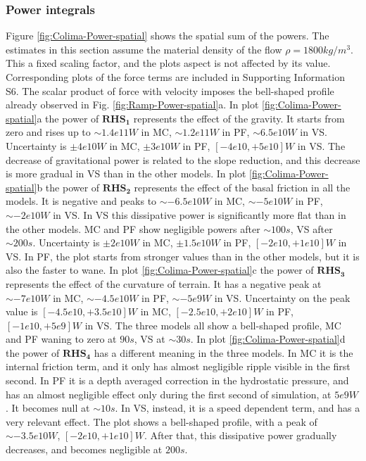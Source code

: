 \documentclass{article}
\begin{document}
\subsubsection{Power integrals}
Figure \ref{fig:Colima-Power-spatial} shows the spatial sum of the powers. The estimates in this section assume the material density of the flow $\rho = 1800 kg/m^3$. This a fixed scaling factor, and the plots aspect is not affected by its value. Corresponding plots of the force terms are included in Supporting Information S6. The scalar product of force with velocity imposes the bell-shaped profile already observed in Fig. \ref{fig:Ramp-Power-spatial}a. In plot \ref{fig:Colima-Power-spatial}a the power of $\boldsymbol{RHS_1}$ represents the effect of the gravity. It starts from zero and rises up to $\sim 1.4e11 W$ in MC, $\sim 1.2e11 W$ in PF, $\sim 6.5e10 W$ in VS. Uncertainty is $\pm 4e10 W$ in MC, $\pm 3e10 W$ in PF, $[-4e10,+5e10] W$ in VS. The decrease of gravitational power is related to the slope reduction, and this decrease is more gradual in VS than in the other models. In plot \ref{fig:Colima-Power-spatial}b the power of  $\boldsymbol{RHS_2}$ represents the effect of the basal friction in all the models. It is negative and peaks to $\sim -6.5e10 W$ in MC, $\sim -5e10 W$ in PF, $\sim -2e10 W$ in VS. In VS this dissipative power is significantly more flat than in the other models. MC and PF show negligible powers after $\sim 100 s$, VS after $\sim 200 s$. Uncertainty is $\pm 2e10 W$ in MC, $\pm 1.5e10 W$ in PF, $[-2e10,+1e10] W$ in VS. In PF, the plot starts from stronger values than in the other models, but it is also the faster to wane. In plot \ref{fig:Colima-Power-spatial}c the power of $\boldsymbol{RHS_3}$ represents the effect of the curvature of terrain. It has a negative peak at $\sim -7e10 W$ in MC, $\sim -4.5e10 W$ in PF, $\sim -5e9 W$ in VS. Uncertainty on the peak value is $[-4.5e10,+3.5e10] W$ in MC, $[-2.5e10,+2e10] W$ in PF, $[-1e10,+5e9] W$ in VS. The three models all show a bell-shaped profile, MC and PF waning to zero at $90 s$, VS at $\sim 30 s$. In plot \ref{fig:Colima-Power-spatial}d the power of $\boldsymbol{RHS_4}$ has a different meaning in the three models. In MC it is the internal friction term, and it only has almost negligible ripple visible in the first second. In PF it is a depth averaged correction in the hydrostatic pressure, and has an almost negligible effect only during the first second of simulation, at $5e9 W$. It becomes null at $\sim 10 s$. In VS, instead, it is a speed dependent term, and has a very relevant effect. The plot shows a bell-shaped profile, with a peak of $\sim -3.5e10 W$, $[-2e10,+1e10] W$. After that, this dissipative power gradually decreases, and becomes negligible at $200 s$.
\end{document}
